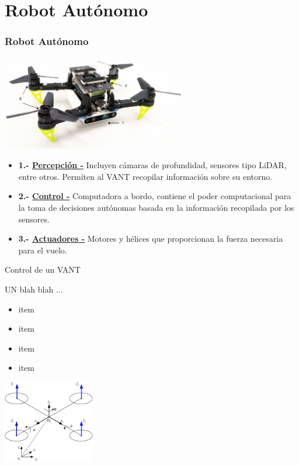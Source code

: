 \documentclass[
  24pt, %
  aspectratio=169, %
]{beamer}
\begin{document}
\section{Robot Autónomo}
\begin{frame}
  \frametitle{Robot Autónomo}

  \centering
  \includegraphics[width=8cm]{drone_taxo}
  \bigskip %
  \begin{itemize}
  \item \textbf{1.- \underline{Percepción -}} Incluyen cámaras de profundidad, sensores tipo LiDAR, entre otros. Permiten al VANT recopilar información sobre su entorno.
  \item \textbf{2.- \underline{Control -}} Computadora a bordo, contiene el poder computacional para la toma de decisiones autónomas basada en la información recopilada por los sensores.
  \item \textbf{3.- \underline{Actuadores -}} Motores y hélices que proporcionan la fuerza necesaria para el vuelo.
  \end{itemize}
\end{frame}

\begin{frame}{Control de un VANT}

  \begin{minipage}{0.47\textwidth}
    
    \small UN blah blah ...
    
    \begin{itemize}
    \item item
    \item item
    \item item
    \item item
    \end{itemize}
  \end{minipage}
  \hspace{0.2cm}
  \begin{minipage}{0.5\textwidth}
    \centering
    \includegraphics[width=4cm]{uav_model.jpeg}
    \bigskip %
  \end{minipage}
\end{frame}
\end{document}
